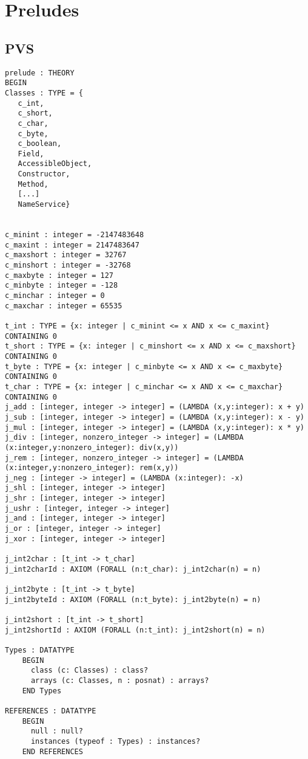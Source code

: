 \chapter{Preludes}
\section{PVS}
 \begin{verbatim}
prelude : THEORY
BEGIN
Classes : TYPE = {
   c_int,
   c_short,
   c_char,
   c_byte,
   c_boolean,
   Field,
   AccessibleObject,
   Constructor,
   Method,
   [...]
   NameService}


c_minint : integer = -2147483648
c_maxint : integer = 2147483647
c_maxshort : integer = 32767
c_minshort : integer = -32768
c_maxbyte : integer = 127
c_minbyte : integer = -128
c_minchar : integer = 0
c_maxchar : integer = 65535

t_int : TYPE = {x: integer | c_minint <= x AND x <= c_maxint} CONTAINING 0
t_short : TYPE = {x: integer | c_minshort <= x AND x <= c_maxshort} CONTAINING 0
t_byte : TYPE = {x: integer | c_minbyte <= x AND x <= c_maxbyte} CONTAINING 0
t_char : TYPE = {x: integer | c_minchar <= x AND x <= c_maxchar} CONTAINING 0
j_add : [integer, integer -> integer] = (LAMBDA (x,y:integer): x + y)
j_sub : [integer, integer -> integer] = (LAMBDA (x,y:integer): x - y)
j_mul : [integer, integer -> integer] = (LAMBDA (x,y:integer): x * y)
j_div : [integer, nonzero_integer -> integer] = (LAMBDA (x:integer,y:nonzero_integer): div(x,y))
j_rem : [integer, nonzero_integer -> integer] = (LAMBDA (x:integer,y:nonzero_integer): rem(x,y))
j_neg : [integer -> integer] = (LAMBDA (x:integer): -x)
j_shl : [integer, integer -> integer]
j_shr : [integer, integer -> integer]
j_ushr : [integer, integer -> integer]
j_and : [integer, integer -> integer]
j_or : [integer, integer -> integer]
j_xor : [integer, integer -> integer]

j_int2char : [t_int -> t_char]
j_int2charId : AXIOM (FORALL (n:t_char): j_int2char(n) = n)

j_int2byte : [t_int -> t_byte]
j_int2byteId : AXIOM (FORALL (n:t_byte): j_int2byte(n) = n)

j_int2short : [t_int -> t_short]
j_int2shortId : AXIOM (FORALL (n:t_int): j_int2short(n) = n)

Types : DATATYPE
    BEGIN
      class (c: Classes) : class?
      arrays (c: Classes, n : posnat) : arrays?
    END Types

REFERENCES : DATATYPE
    BEGIN
      null : null?
      instances (typeof : Types) : instances?
    END REFERENCES


\end{verbatim}
